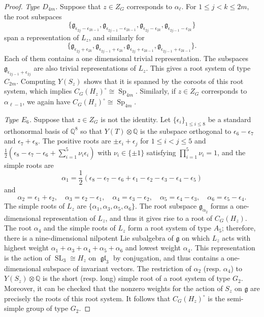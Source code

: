 \documentclass[11pt,oneside,dvipsnames]{amsart}
\theoremstyle{plain}
\theoremstyle{definition}
\theoremstyle{named}
\DeclareMathOperator{\gl}{\mathfrak{gl}}
\DeclareMathOperator{\SL}{SL}
\DeclareMathOperator{\Sp}{Sp}
\begin{document}
\begin{proof}
\textit{Type $D_{4m}$.} Suppose that $z\in Z_G$ corresponds to $\alpha_{\ell}$. For $1\le j<k\le 2m$, the root subspaces
$$
\{\mathfrak{g}_{\epsilon_{2j}-\epsilon_{2k-1}},\mathfrak{g}_{\epsilon_{2j-1}-\epsilon_{2k-1}},\mathfrak{g}_{\epsilon_{2j}-\epsilon_{2k}},\mathfrak{g}_{\epsilon_{2j-1}-\epsilon_{2k}}\}
$$
span a representation of $L_z$, and similarly for
$$
\{\mathfrak{g}_{\epsilon_{2j}+\epsilon_{2k}},\mathfrak{g}_{\epsilon_{2j-1}+\epsilon_{2k}},\mathfrak{g}_{\epsilon_{2j}+\epsilon_{2k-1}},\mathfrak{g}_{\epsilon_{2j-1}+\epsilon_{2k-1}}\}.
$$
Each of them contains a one dimensional trivial representation. The subspaces $\mathfrak{g}_{\epsilon_{2j-1}+\epsilon_{2j}}$ are also trivial representations of $L_z$. This gives a root system of type $C_{2m}$. Computing $Y(S_z)$ shows that it is spanned by the coroots of this root system, which implies $C_G(H_z)^{\circ}\cong\Sp_{4m}$. Similarly, if $z\in Z_G$ corresponds to $\alpha_{\ell-1}$, we again have $C_G(H_z)^{\circ}\cong\Sp_{4m}$. 

\textit{Type $E_6$.} Suppose that $z\in Z_G$ is not the identity. Let $\{\epsilon_i\}_{1\le i\le 8}$ be a standard orthonormal basis of $\mathbb{Q}^8$ so that $Y(T)\otimes\mathbb{Q}$ is the subspace orthogonal to $\epsilon_6-\epsilon_7$ and $\epsilon_7+\epsilon_8$. The positive roots are $\pm\epsilon_i+\epsilon_j$ for $1\le i<j\le 5$ and $\frac{1}{2}(\epsilon_8-\epsilon_7-\epsilon_6+\sum_{i=1}^5\nu_i\epsilon_i)$ with $\nu_i\in\{\pm1\}$ satisfying $\prod_{i=1}^5\nu_i=1$, and the simple roots are 
$$
\alpha_1=\frac{1}{2}(\epsilon_8-\epsilon_7-\epsilon_6+\epsilon_1-\epsilon_2-\epsilon_3-\epsilon_4-\epsilon_5)
$$
and 
$$
\alpha_2=\epsilon_1+\epsilon_2,\quad \alpha_3=\epsilon_2-\epsilon_1,\quad\alpha_4=\epsilon_3-\epsilon_2,\quad\alpha_5=\epsilon_4-\epsilon_3,\quad\alpha_6=\epsilon_5-\epsilon_4.
$$
The simple roots of $L_z$ are $\{\alpha_1,\alpha_3,\alpha_5,\alpha_6\}$. The root subspace $\mathfrak{g}_{\alpha_2}$ forms a one-dimensional representation of $L_z$, and thus it gives rise to a root of $C_G(H_z)$. The root $\alpha_4$ and the simple roots of $L_z$ form a root system of type $A_5$; therefore, there is a nine-dimensional nilpotent Lie subalgebra of $\mathfrak{g}$ on which $L_z$ acts with highest weight $\alpha_1+\alpha_3+\alpha_4+\alpha_5+\alpha_6$ and lowest weight $\alpha_4$. This representation is the action of $\SL_3\cong H_z$ on $\gl_3$ by conjugation, and thus contains a one-dimensional subspace of invariant vectors. The restriction of $\alpha_2$ (resp. $\alpha_4$) to $Y(S_z)\otimes\mathbb{Q}$ is the short (resp. long) simple root of a root system of type $G_2$. Moreover, it can be checked that the nonzero weights for the action of $S_z$ on $\mathfrak{g}$ are precisely the roots of this root system. It follows that $C_G(H_z)^{\circ}$ is the semi-simple group of type $G_2$.


\end{proof}
\end{document}
